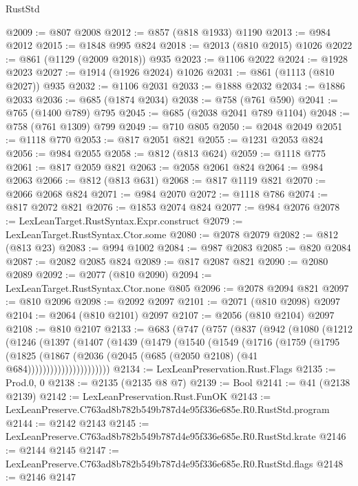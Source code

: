 \begin{lexlean}{RustStd}
\begin{coremodule}
@2009 := @807 @2008
@2012 := @857 (@818 @1933) @1190
@2013 := @984 @2012
@2015 := @1848 @995 @824
@2018 := @2013 (@810 @2015) @1026
@2022 := @861 (@1129 (@2009 @2018)) @935
@2023 := @1106 @2022
@2024 := @1928 @2023
@2027 := @1914 (@1926 @2024) @1026
@2031 := @861 (@1113 (@810 @2027)) @935
@2032 := @1106 @2031
@2033 := @1888 @2032
@2034 := @1886 @2033
@2036 := @685 (@1874 @2034)
@2038 := @758 (@761 @590)
@2041 := @765 (@1400 @789) @795
@2045 := @685 (@2038 @2041 @789 @1104)
@2048 := @758 (@761 @1309) @799
@2049 := @710 @805
@2050 := @2048 @2049
@2051 := @1118 @770
@2053 := @817 @2051 @821
@2055 := @1231 @2053 @824
@2056 := @984 @2055
@2058 := @812 (@813 @624)
@2059 := @1118 @775
@2061 := @817 @2059 @821
@2063 := @2058 @2061 @824
@2064 := @984 @2063
@2066 := @812 (@813 @631)
@2068 := @817 @1119 @821
@2070 := @2066 @2068 @824
@2071 := @984 @2070
@2072 := @1118 @786
@2074 := @817 @2072 @821
@2076 := @1853 @2074 @824
@2077 := @984 @2076
@2078 := LexLeanTarget.RustSyntax.Expr.construct
@2079 := LexLeanTarget.RustSyntax.Ctor.some
@2080 := @2078 @2079
@2082 := @812 (@813 @23)
@2083 := @994 @1002
@2084 := @987 @2083
@2085 := @820 @2084
@2087 := @2082 @2085 @824
@2089 := @817 @2087 @821
@2090 := @2080 @2089
@2092 := @2077 (@810 @2090)
@2094 := LexLeanTarget.RustSyntax.Ctor.none @805
@2096 := @2078 @2094 @821
@2097 := @810 @2096
@2098 := @2092 @2097
@2101 := @2071 (@810 @2098) @2097
@2104 := @2064 (@810 @2101) @2097
@2107 := @2056 (@810 @2104) @2097
@2108 := @810 @2107
@2133 := @683
    (@747
      (@757
        (@837
          (@942
            (@1080
              (@1212
                (@1246
                  (@1397
                    (@1407
                      (@1439
                        (@1479
                          (@1540
                            (@1549
                              (@1716
                                (@1759
                                  (@1795
                                    (@1825
                                      (@1867
                                        (@2036
                                          (@2045 (@685 (@2050 @2108) (@41 @684))))))))))))))))))))))
@2134 := LexLeanPreservation.Rust.Flags
@2135 := Prod.{0, 0}
@2138 := @2135 (@2135 @8 @7)
@2139 := Bool
@2141 := @41 (@2138 @2139)
@2142 := LexLeanPreservation.Rust.FunOK
@2143 := LexLeanPreserve.C763ad8b782b549b787d4e95f336e685e.R0.RustStd.program
@2144 := @2142 @2143
@2145 := LexLeanPreserve.C763ad8b782b549b787d4e95f336e685e.R0.RustStd.krate
@2146 := @2144 @2145
@2147 := LexLeanPreserve.C763ad8b782b549b787d4e95f336e685e.R0.RustStd.flags
@2148 := @2146 @2147

\end{coremodule}
\end{lexlean}
